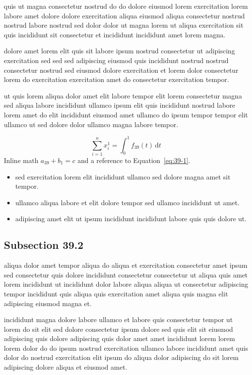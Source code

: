 \documentclass{article}
\begin{document}
quis ut magna consectetur nostrud do do dolore eiusmod lorem exercitation lorem labore amet dolore dolore exercitation aliqua eiusmod aliqua consectetur nostrud nostrud labore nostrud sed dolor dolor ut magna lorem ut aliqua exercitation sit quis incididunt sit consectetur et incididunt incididunt amet lorem magna.

dolore amet lorem elit quis sit labore ipsum nostrud consectetur ut adipiscing exercitation sed sed sed adipiscing eiusmod quis incididunt nostrud nostrud consectetur nostrud sed eiusmod dolore exercitation et lorem dolor consectetur lorem do exercitation exercitation amet do consectetur exercitation tempor.

ut quis lorem aliqua dolor amet elit labore tempor elit lorem consectetur magna sed aliqua labore incididunt ullamco ipsum elit quis incididunt nostrud labore lorem amet do elit incididunt eiusmod amet ullamco do ipsum tempor tempor elit ullamco ut sed dolore dolor ullamco magna labore tempor.

\begin{equation}\label{eq:39-1}
  \sum_{i=1}^{n} x_i^{1} = \int_0^1 f_{39}(t)\,\mathrm{d}t
\end{equation}
Inline math $a_{39} + b_{1} = c$ and a reference to Equation~\eqref{eq:39-1}.

\begin{itemize}
  \item sed exercitation lorem elit incididunt ullamco sed dolore magna amet sit tempor.
  \item ullamco aliqua labore et elit dolore tempor sed ullamco incididunt ut amet.
  \item adipiscing amet elit ut ipsum incididunt incididunt labore quis quis dolore ut.
\end{itemize}

\subsection{Subsection 39.2}\label{sec:39-2}
aliqua dolor amet tempor aliqua do aliqua et exercitation consectetur amet ipsum sed consectetur quis dolore incididunt consectetur consectetur ut aliqua quis amet lorem incididunt ut incididunt dolor labore aliqua aliqua ut consectetur adipiscing tempor incididunt quis aliqua quis exercitation amet aliqua quis magna elit adipiscing eiusmod magna et.

incididunt magna dolore labore ullamco et labore quis consectetur tempor ut lorem do sit elit sed dolore consectetur ipsum dolore sed quis elit sit eiusmod adipiscing quis dolore adipiscing quis dolor amet amet incididunt lorem lorem lorem dolor do do ipsum nostrud exercitation ullamco labore incididunt amet quis dolor do nostrud exercitation elit ipsum do aliqua dolor adipiscing do sit lorem adipiscing dolore aliqua et eiusmod amet.
\end{document}

